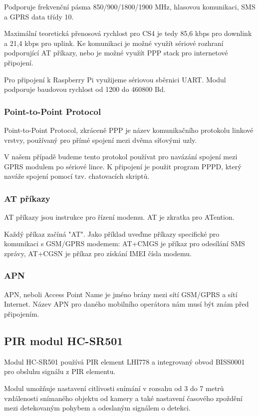 Podporuje frekvenční pásma 850/900/1800/1900 MHz, hlasovou komunikaci, SMS a GPRS data třídy 10.

Maximální teoretická přenosová rychlost pro CS4 je tedy 85,6 kbps pro downlink a 21,4 kbps pro uplink. Ke komunikaci je možné využít sériové rozhraní podporující AT příkazy, nebo je možné využít PPP stack pro internetové připojení.

Pro připojení k Raspberry Pi využijeme sériovou sběrnici UART. Modul podporuje baudovou rychlost od 1200 do 460800 Bd. 

\subsubsection{Point-to-Point Protocol}
Point-to-Point Protocol, zkráceně PPP je název komunikačního protokolu linkové vrstvy, používaný pro přímé spojení mezi dvěma síťovými uzly.

V našem případě budeme tento protokol používat pro navázání spojení mezi GPRS modulem po sériové lince. K připojení je použit program PPPD, který naváže spojení pomocí tzv. chatovacích skriptů.

\subsubsection{AT příkazy}
AT příkazy jsou instrukce pro řízení modemu. AT je zkratka pro ATention.

Každý příkaz začíná "AT". Jako příklad uveďme příkazy specifické pro komunikaci s GSM/GPRS modemem: AT+CMGS je příkaz pro odesílání SMS zprávy, AT+CGSN je příkaz pro získání IMEI čísla modemu.

\subsubsection{APN}
APN, neboli Access Point Name je jméno brány mezi sítí GSM/GPRS a sítí Internet. Název APN pro daného mobilního operátora nám musí být znám před připojením.

\subsection*{PIR modul HC-SR501}
Modul HC-SR501 používá PIR element LHI778 a integrovaný obvod BISS0001 pro obsluhu signálu z PIR elementu.

Modul umožňuje nastavení citlivosti snímání v rozsahu od 3 do 7 metrů vzdálenosti snímaného objektu od kamery a také nastavení časového zpoždění mezi detekovaným pohybem a odeslaným signálem o detekci.

